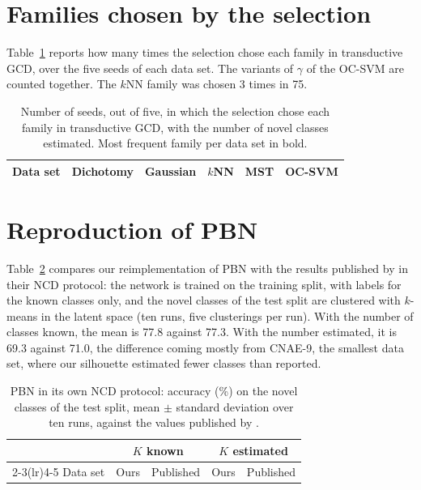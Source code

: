 \documentclass[pdflatex,sn-basic]{sn-jnl}
\begin{document}
\begin{appendices}

\section{Families chosen by the selection}\label{app:chosen}

Table~\ref{tab:chosen} reports how many times the selection chose each family in transductive GCD, over the five seeds of each data set. The variants of $\gamma$ of the OC-SVM are counted together. The $k$NN family was chosen 3 times in 75.

\begin{table}[h]
\caption{Number of seeds, out of five, in which the selection chose each family in transductive GCD, with the number of novel classes estimated. Most frequent family per data set in bold.}\label{tab:chosen}
\centering\footnotesize
\begin{tabular}{@{}lrrrrr@{}}
\toprule
Data set & Dichotomy & Gaussian & $k$NN & MST & OC-SVM \\
\midrule

\end{tabular}
\end{table}

\section{Reproduction of PBN}\label{app:pbn}

Table~\ref{tab:pbnrepro} compares our reimplementation of PBN with the results published by \citet{troisemaine2024pbn} in their NCD protocol: the network is trained on the training split, with labels for the known classes only, and the novel classes of the test split are clustered with $k$-means in the latent space (ten runs, five clusterings per run). With the number of classes known, the mean is 77.8 against 77.3. With the number estimated, it is 69.3 against 71.0, the difference coming mostly from CNAE-9, the smallest data set, where our silhouette estimated fewer classes than reported.

\begin{table}[h]
\caption{PBN in its own NCD protocol: accuracy (\%) on the novel classes of the test split, mean $\pm$ standard deviation over ten runs, against the values published by \citet{troisemaine2024pbn}.}\label{tab:pbnrepro}
\centering\footnotesize
\begin{tabular}{@{}lrrrr@{}}
\toprule
 & \multicolumn{2}{c}{$K$ known} & \multicolumn{2}{c}{$K$ estimated} \\
\cmidrule(lr){2-3}\cmidrule(lr){4-5}
Data set & Ours & Published & Ours & Published \\
\midrule

\end{tabular}
\end{table}


\end{appendices}
\end{document}
